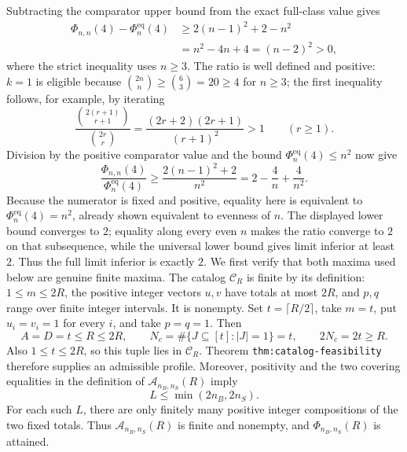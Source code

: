 Subtracting the comparator upper bound from the exact full-class value gives
\[
\begin{aligned}
\Phi_{n,n}(4)-\Phi_n^{\mathrm{eq}}(4)
&\ge 2(n-1)^2+2-n^2\\
&=n^2-4n+4=(n-2)^2>0,
\end{aligned}
\]
where the strict inequality uses \(n\ge3\). The ratio is well defined and positive: \(k=1\) is eligible because \(\binom{2n}{n}\ge\binom63=20\ge4\) for \(n\ge3\); the first inequality follows, for example, by iterating
\[
\frac{\binom{2(r+1)}{r+1}}{\binom{2r}{r}}
=\frac{(2r+2)(2r+1)}{(r+1)^2}>1
\qquad(r\ge1).
\]
Division by the positive comparator value and the bound \(\Phi_n^{\mathrm{eq}}(4)\le n^2\) now give
\[
\frac{\Phi_{n,n}(4)}{\Phi_n^{\mathrm{eq}}(4)}
\ge \frac{2(n-1)^2+2}{n^2}
=2-\frac4n+\frac4{n^2}.
\]
Because the numerator is fixed and positive, equality here is equivalent to \(\Phi_n^{\mathrm{eq}}(4)=n^2\), already shown equivalent to evenness of \(n\). The displayed lower bound converges to \(2\); equality along every even \(n\) makes the ratio converge to \(2\) on that subsequence, while the universal lower bound gives limit inferior at least \(2\). Thus the full limit inferior is exactly \(2\).
We first verify that both maxima used below are genuine finite maxima. The catalog \(\mathcal C_R\) is finite by its definition: \(1\le m\le2R\), the positive integer vectors \(u,v\) have totals at most \(2R\), and \(p,q\) range over finite integer intervals. It is nonempty. Set \(t=\lceil R/2\rceil\), take \(m=t\), put \(u_i=v_i=1\) for every \(i\), and take \(p=q=1\). Then
\[
A=D=t\le R\le2R,
\qquad
N_c=\#\{J\subseteq[t]:|J|=1\}=t,
\qquad
2N_c=2t\ge R.
\]
Also \(1\le t\le2R\), so this tuple lies in \(\mathcal C_R\). Theorem \texttt{thm:catalog-feasibility} therefore supplies an admissible profile. Moreover, positivity and the two covering equalities in the definition of \(\mathcal A_{n_B,n_S}(R)\) imply
\[
L\le \min(2n_B,2n_S).
\]
For each such \(L\), there are only finitely many positive integer compositions of the two fixed totals. Thus \(\mathcal A_{n_B,n_S}(R)\) is finite and nonempty, and \(\Phi_{n_B,n_S}(R)\) is attained.

